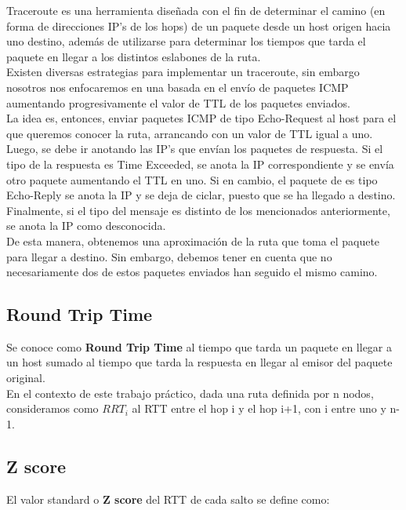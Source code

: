 \indent \indent Traceroute es una herramienta diseñada con el fin de determinar el camino (en forma de direcciones IP's de los hops) de un paquete desde un host origen hacia uno destino, además de utilizarse para determinar los tiempos que tarda el paquete en llegar a los distintos eslabones de la ruta.\\
\indent Existen diversas estrategias para implementar un traceroute, sin embargo nosotros nos enfocaremos en una basada en el envío de paquetes ICMP aumentando progresivamente el valor de TTL de los paquetes enviados.\\
\indent La idea es, entonces, enviar paquetes ICMP de tipo Echo-Request al host para el que queremos conocer la ruta, arrancando con un valor de TTL igual a uno. Luego, se debe ir anotando las IP's que envían los paquetes de respuesta. Si el tipo de la respuesta es Time Exceeded, se anota la IP correspondiente y se envía otro paquete aumentando el TTL en uno. Si en cambio, el paquete de es tipo Echo-Reply se anota la IP y se deja de ciclar, puesto que se ha llegado a destino. Finalmente, si el tipo del mensaje es distinto de los mencionados anteriormente, se anota la IP como desconocida.\\
\indent De esta manera, obtenemos una aproximación de la ruta que toma el paquete para llegar a destino. Sin embargo, debemos tener en cuenta que no necesariamente dos de estos paquetes enviados han seguido el mismo camino.\\

\subsection{Round Trip Time}

\indent \indent Se conoce como \textbf{Round Trip Time} al tiempo que tarda un paquete en llegar a un host sumado al tiempo que tarda la respuesta en llegar al emisor del paquete original.\\
\indent En el contexto de este trabajo práctico, dada una ruta definida por n nodos, consideramos como $RRT_i$ al RTT entre el hop i y el hop i+1, con i entre uno y n-1.\\

\subsection{Z score}

\indent \indent El valor standard o \textbf{Z score} del RTT de cada salto se define como:\newline


